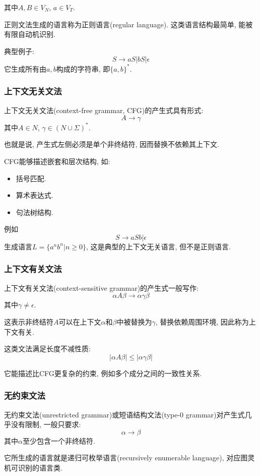 其中$A,B \in V_N$, $a \in V_T$.

正则文法生成的语言称为正则语言(regular language).
这类语言结构最简单, 能被有限自动机识别.

典型例子:
\[
S \to a S | b S | \epsilon
\]
它生成所有由$a,b$构成的字符串, 即$\{a,b\}^*$.

\subsubsection{上下文无关文法}


上下文无关文法(context-free grammar, CFG)的产生式具有形式:
\[
A \to \gamma
\]
其中$A \in N$, $\gamma \in (N \cup \Sigma)^*$.

也就是说, 产生式左侧必须是单个非终结符, 因而替换不依赖其上下文.

CFG能够描述嵌套和层次结构, 如:

\begin{itemize}
\item 括号匹配.
\item 算术表达式.
\item 句法树结构.
\end{itemize}

例如
\[
S \to a S b | \epsilon
\]
生成语言$L = \{a^n b^n | n \ge 0\}$, 这是典型的上下文无关语言, 但不是正则语言.

\subsubsection{上下文有关文法}


上下文有关文法(context-sensitive grammar)的产生式一般写作:
\[
\alpha A \beta \to \alpha \gamma \beta
\]
其中$\gamma \ne \epsilon$.

这表示非终结符$A$可以在上下文$\alpha$和$\beta$中被替换为$\gamma$, 替换依赖周围环境, 因此称为上下文有关.

这类文法满足长度不减性质:
\[
|\alpha A \beta| \le |\alpha \gamma \beta|
\]

它能描述比CFG更复杂的约束, 例如多个成分之间的一致性关系.

\subsubsection{无约束文法}


无约束文法(unrestricted grammar)或短语结构文法(type-0 grammar)对产生式几乎没有限制, 一般只要求:
\[
\alpha \to \beta
\]
其中$\alpha$至少包含一个非终结符.

它所生成的语言就是递归可枚举语言(recursively enumerable language), 对应图灵机可识别的语言类.


